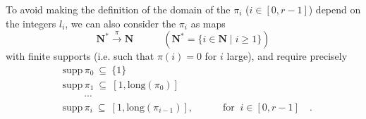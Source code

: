 To avoid making the definition of the domain of the $\pi_i$ ($i\in[0,r-1]$) depend on the integers $l_i$, we can also consider the $\pi_i$ as maps
\[
\mathbf{N}^*\xrightarrow{\ \pi\ }\mathbf{N} \qquad\quad (\mathbf{N}^*=\{i\in\mathbf{N}\mid i\geq 1\})
\]
with finite supports (i.e. such that $\pi(i)=0$ for $i$ large), and require precisely
\[
\begin{aligned}
&\mathrm{supp}\,\pi_0\ \subseteq\ \{1\}\\
&\mathrm{supp}\,\pi_1\ \subseteq\ [1,\mathrm{long}(\pi_0)]\\
&\qquad\ \cdots\\
&\boxed{\mathrm{supp}\,\pi_i\ \subseteq\ [1,\mathrm{long}(\pi_{i-1})]}, \qquad\quad \text{for }\ \boxed{i\in[0,r-1]}\quad .
\end{aligned}
\tag*{$(**)$}
\]
